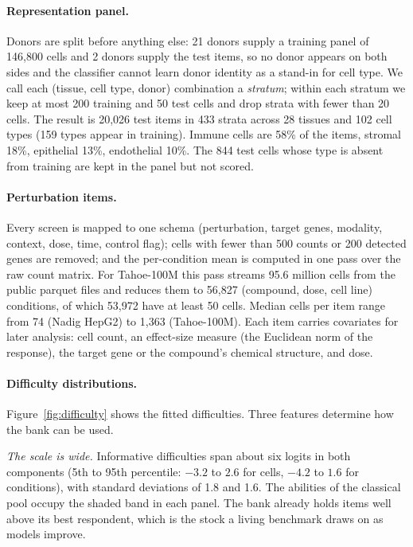 \documentclass[11pt]{article}
\begin{document}
\paragraph{Representation panel.}
Donors are split before anything else: 21 donors supply a training panel of 146,800
cells and 2 donors supply the test items, so no donor appears on both sides and the
classifier cannot learn donor identity as a stand-in for cell type. We call each (tissue, cell type, donor) combination a \emph{stratum}; within each stratum
we keep at most 200 training and 50 test cells and drop strata with fewer than 20 cells. The result is 20,026 test items in 433 strata
across 28 tissues and 102 cell types (159 types appear in training). Immune cells are
58\% of the items, stromal 18\%, epithelial 13\%, endothelial 10\%. The 844 test cells
whose type is absent from training are kept in the panel but not scored.

\paragraph{Perturbation items.}
Every screen is mapped to one schema (perturbation, target genes, modality, context,
dose, time, control flag); cells with fewer than 500 counts or 200 detected genes are
removed; and the per-condition mean is computed in one pass over the raw count
matrix. For Tahoe-100M this pass streams 95.6 million cells from the public parquet
files and reduces them to 56,827 (compound, dose, cell line) conditions, of which
53,972 have at least 50 cells. Median cells per item range from 74 (Nadig HepG2) to
1,363 (Tahoe-100M). Each item carries covariates for later analysis: cell count, an
effect-size measure (the Euclidean norm of the response), the target gene or the
compound's chemical structure, and dose.

\paragraph{Difficulty distributions.}
Figure~\ref{fig:difficulty} shows the fitted difficulties. Three features determine
how the bank can be used.

\emph{The scale is wide.} Informative difficulties span about six logits in both
components (5th to 95th percentile: $-3.2$ to $2.6$ for cells, $-4.2$ to $1.6$ for
conditions), with standard deviations of 1.8 and 1.6. The abilities of the classical
pool occupy the shaded band in each panel. The bank already holds items well above
its best respondent, which is the stock a living benchmark draws on as models
improve.
\end{document}
